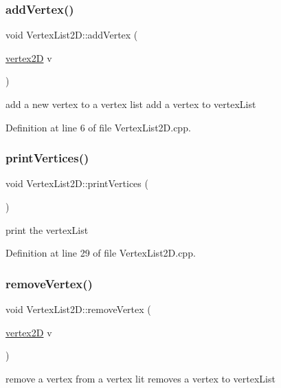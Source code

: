 \subsubsection{\texorpdfstring{add\+Vertex()}{addVertex()}}
{\footnotesize\ttfamily void Vertex\+List2\+D\+::add\+Vertex (\begin{DoxyParamCaption}\item[{\mbox{\hyperlink{structvertex2_d}{vertex2D}}}]{v }\end{DoxyParamCaption})}

add a new vertex to a vertex list add a vertex to vertex\+List

Definition at line 6 of file Vertex\+List2\+D.\+cpp.

\mbox{\label{class_vertex_list2_d_a4ac4c80ae89813ad34bcd68c9ac5b97e}} 
\subsubsection{\texorpdfstring{print\+Vertices()}{printVertices()}}
{\footnotesize\ttfamily void Vertex\+List2\+D\+::print\+Vertices (\begin{DoxyParamCaption}{ }\end{DoxyParamCaption})}

print the vertex\+List

Definition at line 29 of file Vertex\+List2\+D.\+cpp.

\mbox{\label{class_vertex_list2_d_af5f14271403582b3648b184d90f0c1d4}} 
\subsubsection{\texorpdfstring{remove\+Vertex()}{removeVertex()}}
{\footnotesize\ttfamily void Vertex\+List2\+D\+::remove\+Vertex (\begin{DoxyParamCaption}\item[{\mbox{\hyperlink{structvertex2_d}{vertex2D}}}]{v }\end{DoxyParamCaption})}

remove a vertex from a vertex lit removes a vertex to vertex\+List

